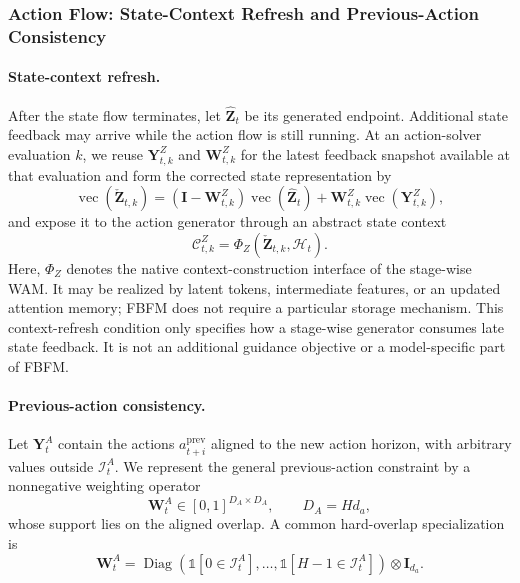 \subsubsection{Action Flow: State-Context Refresh and Previous-Action Consistency}

\paragraph{State-context refresh.}

After the state flow terminates, let $\hat{\mathbf Z}_t$ be its generated endpoint.
Additional state feedback may arrive while the action flow is still running. At an
action-solver evaluation $k$, we reuse $\mathbf Y_{t,k}^Z$ and
$\mathbf W_{t,k}^Z$ for the latest feedback snapshot available at that evaluation
and form the corrected state representation by
\begin{equation}
    \operatorname{vec}(\check{\mathbf Z}_{t,k})
    =
    \left(\mathbf I-\mathbf W_{t,k}^Z\right)
    \operatorname{vec}(\hat{\mathbf Z}_t)
    +
    \mathbf W_{t,k}^Z
    \operatorname{vec}(\mathbf Y_{t,k}^Z),
    \label{eq:refreshed-state-representation}
\end{equation}
and expose it to the action generator through an abstract state context
\begin{equation}
    \mathcal C_{t,k}^Z
    =
    \Phi_Z(\check{\mathbf Z}_{t,k},\mathcal H_t).
    \label{eq:state-context-interface}
\end{equation}
Here, $\Phi_Z$ denotes the native context-construction interface of the stage-wise
WAM. It may be realized by latent tokens, intermediate features, or an updated
attention memory; FBFM does not require a particular storage mechanism. This
context-refresh condition only specifies how a stage-wise generator consumes late
state feedback. It is not an additional guidance objective or a model-specific part
of FBFM.

\paragraph{Previous-action consistency.}

Let $\mathbf Y_t^A$ contain the actions $a_{t+i}^{\mathrm{prev}}$ aligned to the
new action horizon, with arbitrary values outside $\mathcal I_t^A$. We represent the
general previous-action constraint by a nonnegative weighting operator
\begin{equation}
    \mathbf W_t^A\in[0,1]^{D_A\times D_A},
    \qquad D_A=H d_a,
    \label{eq:general-action-weight}
\end{equation}
whose support lies on the aligned overlap. A common hard-overlap specialization is
\begin{equation}
    \mathbf W_t^A
    =
    \operatorname{Diag}
    \!\left(
        \mathbb 1[0\in\mathcal I_t^A],\ldots,
        \mathbb 1[H-1\in\mathcal I_t^A]
    \right)
    \otimes\mathbf I_{d_a}.
    \label{eq:hard-overlap-action-mask}
\end{equation}

